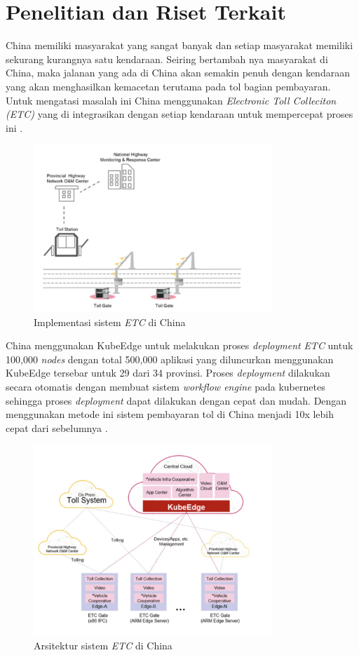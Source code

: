 \section{Penelitian dan Riset Terkait}

China memiliki masyarakat yang sangat banyak dan setiap masyarakat memiliki sekurang kurangnya satu kendaraan. Seiring bertambah nya masyarakat di China, maka jalanan yang ada di China akan semakin penuh dengan kendaraan yang akan menghasilkan kemacetan terutama pada tol bagian pembayaran. Untuk mengatasi masalah ini China menggunakan \textit{Electronic Toll Colleciton (ETC)} yang di integrasikan dengan setiap kendaraan untuk mempercepat proses ini \parencite{penelitianterkait1}.

\begin{figure}[h]
  \centering
  \includegraphics[width=0.8\textwidth]{resources/chapter-2/china-highways.jpg}
  \caption{Implementasi sistem \textit{ETC} di China \parencite{penelitianterkait1}}
  \label{fig:china-highways}
\end{figure}

China menggunakan KubeEdge untuk melakukan proses \textit{deployment} \textit{ETC} untuk 100,000 \textit{nodes} dengan total 500,000 aplikasi yang diluncurkan menggunakan KubeEdge tersebar untuk 29 dari 34 provinsi. Proses \textit{deployment} dilakukan secara otomatis dengan membuat sistem \textit{workflow engine} pada kubernetes sehingga proses \textit{deployment} dapat dilakukan dengan cepat dan mudah. Dengan menggunakan metode ini sistem pembayaran tol di China menjadi 10x lebih cepat dari sebelumnya \parencite{penelitianterkait1}.

\begin{figure}[h]
  \includegraphics[width=0.8\textwidth]{resources/chapter-2/arsitektur-china-highways.jpg}
  \caption{Arsitektur sistem \textit{ETC} di China \parencite{penelitianterkait1}}
  \label{fig:architecture-china-highways}
\end{figure}



